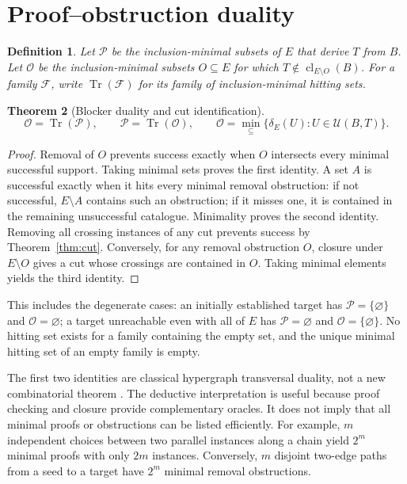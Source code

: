 \documentclass[11pt]{article}
\newtheorem{theorem}{Theorem}[section]
\newtheorem{definition}[theorem]{Definition}
\theoremstyle{remark}\newtheorem{remark}[theorem]{Remark}
\newcommand{\cl}{\operatorname{cl}}
\newcommand{\cU}{\mathcal U}
\newcommand{\cP}{\mathcal P}
\newcommand{\cO}{\mathcal O}
\newcommand{\hit}{\operatorname{Tr}}
\begin{document}
\section{Proof--obstruction duality}
\begin{definition}
Let $\cP$ be the inclusion-minimal subsets of $E$ that derive $T$ from $B$. Let $\cO$ be the inclusion-minimal subsets $O\subseteq E$ for which $T\notin\cl_{E\setminus O}(B)$. For a family $\mathcal F$, write $\hit(\mathcal F)$ for its family of inclusion-minimal hitting sets.
\end{definition}
\begin{theorem}[Blocker duality and cut identification]\label{thm:dual}
\[
\cO=\hit(\cP),\qquad \cP=\hit(\cO),\qquad
\cO=\min_{\subseteq}\{\delta_E(U):U\in\cU(B,T)\}.
\]
\end{theorem}
\begin{proof}
Removal of $O$ prevents success exactly when $O$ intersects every minimal successful support. Taking minimal sets proves the first identity. A set $A$ is successful exactly when it hits every minimal removal obstruction: if not successful, $E\setminus A$ contains such an obstruction; if it misses one, it is contained in the remaining unsuccessful catalogue. Minimality proves the second identity. Removing all crossing instances of any cut prevents success by Theorem~\ref{thm:cut}. Conversely, for any removal obstruction $O$, closure under $E\setminus O$ gives a cut whose crossings are contained in $O$. Taking minimal elements yields the third identity.
\end{proof}
This includes the degenerate cases: an initially established target has $\cP=\{\varnothing\}$ and $\cO=\varnothing$; a target unreachable even with all of $E$ has $\cP=\varnothing$ and $\cO=\{\varnothing\}$. No hitting set exists for a family containing the empty set, and the unique minimal hitting set of an empty family is empty.

The first two identities are classical hypergraph transversal duality, not a new combinatorial theorem \cite{eiter}. The deductive interpretation is useful because proof checking and closure provide complementary oracles. It does not imply that all minimal proofs or obstructions can be listed efficiently. For example, $m$ independent choices between two parallel instances along a chain yield $2^m$ minimal proofs with only $2m$ instances. Conversely, $m$ disjoint two-edge paths from a seed to a target have $2^m$ minimal removal obstructions.
\end{document}
